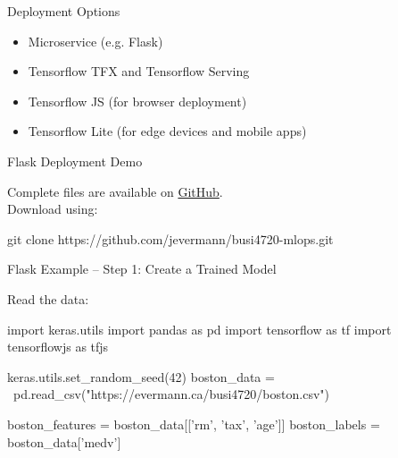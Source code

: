 \documentclass[ignorenonframetext,xcolor=x11names]{beamer}
\begin{document}

\begin{frame}{Deployment Options}
\begin{itemize}
   \item Microservice (e.g. Flask)
   \item Tensorflow TFX and Tensorflow Serving 
   \item Tensorflow JS (for browser deployment)
   \item Tensorflow Lite (for edge devices and mobile apps)
\end{itemize}
\end{frame}

\begin{frame}[fragile]{Flask Deployment Demo}

Complete files are available on \href{https://github.com/jevermann/busi4720-mlops/blob/main/train_model.py}{GitHub}. \\

Download using:
\begin{bashcode}
git clone https://github.com/jevermann/busi4720-mlops.git
\end{bashcode}

\end{frame}

\begin{frame}[fragile]{Flask Example -- Step 1: Create a Trained Model} 

Read the data:
\begin{pythoncode}
import keras.utils
import pandas as pd
import tensorflow as tf
import tensorflowjs as tfjs

keras.utils.set_random_seed(42)
boston_data = \
 pd.read_csv("https://evermann.ca/busi4720/boston.csv")

boston_features = boston_data[['rm', 'tax', 'age']]
boston_labels = boston_data['medv']
\end{pythoncode}

\end{frame}
\end{document}
